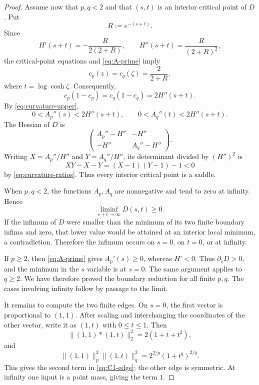\documentclass[11pt,reqno]{amsart}
\numberwithin{equation}{section}
\theoremstyle{definition}
\theoremstyle{remark}
\begin{document}
\begin{proof}
Assume now that $p,q<2$ and that $(s,t)$ is an interior critical point of $D$.  Put
\[
  R:=e^{-(s+t)}.
\]
Since
\begin{equation}\label{eq:H-derivatives}
  H'(s+t)=-\frac{R}{2(2+R)},
  \qquad
  H''(s+t)=\frac{R}{(2+R)^2},
\end{equation}
the critical-point equations and \eqref{eq:A-prime} imply
\begin{equation}\label{eq:c-critical}
  c_p(z)=c_q(\zeta)=\frac2{2+R},
\end{equation}
where $t=\log\cosh\zeta$.  Consequently,
\[
  c_p(1-c_p)=c_q(1-c_q)=2H''(s+t).
\]
By \eqref{eq:curvature-upper},
\begin{equation}\label{eq:curvature-ratios}
  0<A_p''(s)<2H''(s+t),
  \qquad
  0<A_q''(t)<2H''(s+t).
\end{equation}
The Hessian of $D$ is
\[
  \begin{pmatrix}
    A_p''-H'' & -H''\\
    -H'' & A_q''-H''
  \end{pmatrix}.
\]
Writing $X=A_p''/H''$ and $Y=A_q''/H''$, its determinant divided by $(H'')^2$ is
\[
  XY-X-Y=(X-1)(Y-1)-1<0
\]
by \eqref{eq:curvature-ratios}.  Thus every interior critical point is a saddle.

When $p,q<2$, the functions $A_p,A_q$ are nonnegative and tend to zero at infinity.  Hence
\[
  \liminf_{s+t\to\infty}D(s,t)\ge0.
\]
If the infimum of $D$ were smaller than the minimum of its two finite boundary infima and zero, that lower value would be attained at an interior local minimum, a contradiction.  Therefore the infimum occurs on $s=0$, on $t=0$, or at infinity.

If $p\ge2$, then \eqref{eq:A-prime} gives $A_p'(s)\ge0$, whereas $H'<0$.  Thus $\partial_sD>0$, and the minimum in the $s$ variable is at $s=0$.  The same argument applies to $q\ge2$.  We have therefore proved the boundary reduction for all finite $p,q$.  The cases involving infinity follow by passage to the limit.

It remains to compute the two finite edges.  On $s=0$, the first vector is proportional to $(1,1)$.  After scaling and interchanging the coordinates of the other vector, write it as $(1,t)$ with $0\le t\le1$.  Then
\[
  \|(1,1)*(1,t)\|_2^2=2(1+t+t^2),
\]
and
\[
  \|(1,1)\|_p^2\|(1,t)\|_q^2
  =2^{2/p}(1+t^q)^{2/q}.
\]
This gives the second term in \eqref{eq:C1-edge}; the other edge is symmetric.  At infinity one input is a point mass, giving the term $1$.
\end{proof}
\end{document}

